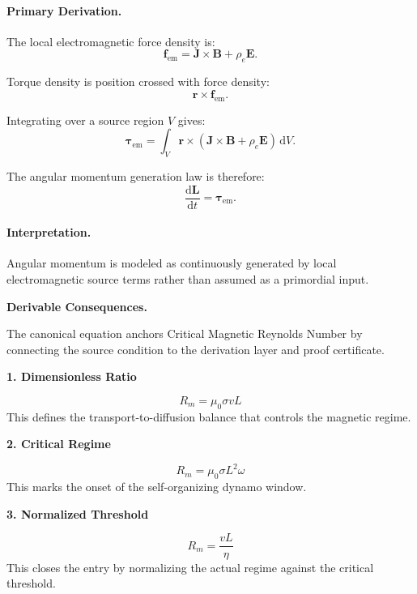 \paragraph{Primary Derivation.}
The local electromagnetic force density is:
\begin{equation}
\mathbf{f}_{\mathrm{em}}
=
\mathbf{J}\times\mathbf{B}
+
\rho_e\mathbf{E}.
\end{equation}

Torque density is position crossed with force density:
\begin{equation}
\mathbf{r}\times\mathbf{f}_{\mathrm{em}}.
\end{equation}

Integrating over a source region $V$ gives:
\begin{equation}
\boldsymbol{\tau}_{\mathrm{em}}
=
\int_V
\mathbf{r}\times
\left(
\mathbf{J}\times\mathbf{B}
+
\rho_e\mathbf{E}
\right)
\,\mathrm{d}V .
\end{equation}

The angular momentum generation law is therefore:
\begin{equation}
\boxed{
\frac{\mathrm{d}\mathbf{L}}{\mathrm{d}t}
=
\boldsymbol{\tau}_{\mathrm{em}} .
}
\end{equation}

\paragraph{Interpretation.}
Angular momentum is modeled as continuously generated by local electromagnetic source terms rather than assumed as a primordial input.

\par\vspace{0.35em}
\noindent\textbf{Derivable Consequences.}\quad
\begingroup
\footnotesize
\raggedright
The canonical equation anchors Critical Magnetic Reynolds Number by connecting the source condition to the derivation layer and proof certificate.
\par\endgroup

\noindent\textbf{1. Dimensionless Ratio}\par
\[
R_m=\mu_0\sigma vL
\]
\noindent This defines the transport-to-diffusion balance that controls the magnetic regime.\par
\noindent\textbf{2. Critical Regime}\par
\[
R_m=\mu_0\sigma L^2\omega
\]
\noindent This marks the onset of the self-organizing dynamo window.\par
\noindent\textbf{3. Normalized Threshold}\par
\[
R_m=\frac{vL}{\eta}
\]
\noindent This closes the entry by normalizing the actual regime against the critical threshold.\par

